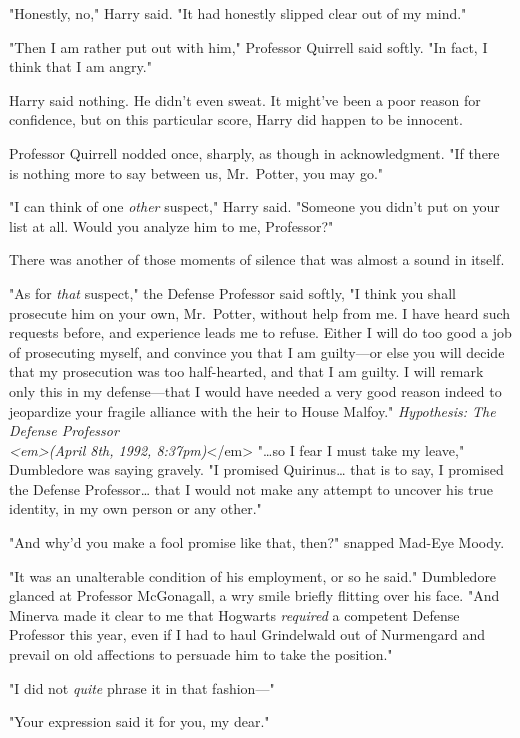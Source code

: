 "Honestly, no," Harry said. "It had honestly slipped clear out of my mind."

"Then I am rather put out with him," Professor Quirrell said softly. "In fact, I think that I am angry."

Harry said nothing. He didn't even sweat. It might've been a poor reason for confidence, but on this particular score, Harry did happen to be innocent.

Professor Quirrell nodded once, sharply, as though in acknowledgment. "If there is nothing more to say between us, Mr.~Potter, you may go."

"I can think of one \emph{other} suspect," Harry said. "Someone you didn't put on your list at all. Would you analyze him to me, Professor?"

There was another of those moments of silence that was almost a sound in itself.

"As for \emph{that} suspect," the Defense Professor said softly, "I think you shall prosecute him on your own, Mr.~Potter, without help from me. I have heard such requests before, and experience leads me to refuse. Either I will do too good a job of prosecuting myself, and convince you that I am guilty---or else you will decide that my prosecution was too half-hearted, and that I am guilty. I will remark only this in my defense---that I would have needed a very good reason indeed to jeopardize your fragile alliance with the heir to House Malfoy."
\sbreak
\emph{Hypothesis: The Defense Professor\\
<em>(April 8th, 1992, 8:37pm)}</em>
\sbreak
"{\ldots}so I fear I must take my leave," Dumbledore was saying gravely. "I promised Quirinus{\ldots} that is to say, I promised the Defense Professor{\ldots} that I would not make any attempt to uncover his true identity, in my own person or any other."

"And why'd you make a fool promise like that, then?" snapped Mad-Eye Moody.

"It was an unalterable condition of his employment, or so he said." Dumbledore glanced at Professor McGonagall, a wry smile briefly flitting over his face. "And Minerva made it clear to me that Hogwarts \emph{required} a competent Defense Professor this year, even if I had to haul Grindelwald out of Nurmengard and prevail on old affections to persuade him to take the position."

"I did not \emph{quite} phrase it in that fashion---"

"Your expression said it for you, my dear."

